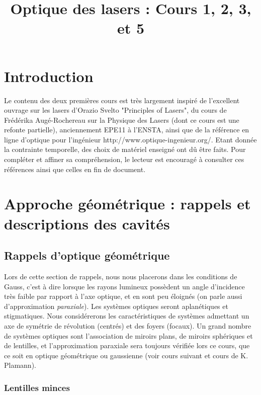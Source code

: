 \documentclass[a4paper]{book}
\title{Optique des lasers : Cours 1, 2, 3, et 5}
\author{}
\date{}
\begin{document}
\maketitle

\chapter*{Introduction}

Le contenu des deux premières  cours est très largement inspiré de l'excellent ouvrage sur les lasers d'Orazio Svelto "Principles of Lasers", du cours de Frédérika Augé-Rochereau sur la Physique des Lasers (dont ce cours est une refonte partielle), anciennement EPE11 à l'ENSTA, ainsi que de la référence en ligne d'optique pour l'ingénieur http://www.optique-ingenieur.org/. Etant donnée la contrainte temporelle, des choix de matériel enseigné ont dû être faits. Pour compléter et affiner sa compréhension, le lecteur est encouragé à consulter ces références ainsi que celles en fin de document.


\chapter{Approche géométrique : rappels et descriptions des cavités}

\section{Rappels d'optique géométrique}
Lors de cette section de rappels, nous nous placerons dans les conditions de Gauss, c'est à dire lorsque les rayons lumineux possèdent un angle d'incidence très faible par rapport à l'axe optique, et en sont peu éloignés (on parle aussi d'approximation \textit{paraxiale}). Les systèmes optiques seront aplanétiques et stigmatiques. Nous considérerons les caractéristiques de systèmes admettant un axe de symétrie de révolution (centrés) et des foyers (focaux). Un grand nombre de systèmes optiques sont l’association de miroirs plans, de miroirs sphériques et de lentilles, et l'approximation paraxiale sera toujours vérifiée lors ce cours, que ce soit en optique géométrique ou gaussienne (voir cours suivant et cours de K. Plamann). 

\subsection{Lentilles minces}
\end{document}

